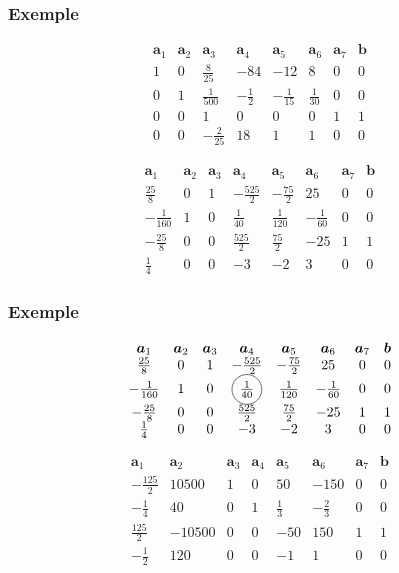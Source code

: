 \documentclass[usepdftitle=false]{beamer}
\newcommand*\circled[1]{\tikz[baseline=(char.base)]{
		\node[shape=circle,draw,inner sep=2pt] (char) {#1};}}
\def\ba{\boldsymbol{a}}
\def\bb{\boldsymbol{b}}
\begin{document}
\begin{frame}
\frametitle{Exemple}

\[
\begin{matrix}
\ba_1 & \ba_2 & \ba_3 & \ba_4 & \ba_5 &\ba_6 &\ba_7 & \bb \\
1 & 0 & \frac{8}{25} & -84 & -12 & 8 & 0 & 0 \\
0 & 1 & \frac{1}{500} & -\frac{1}{2} & -\frac{1}{15} & \frac{1}{30} & 0 & 0 \\
0 & 0 & 1 & 0 & 0 & 0 & 1 & 1 \\
0 & 0 & -\frac{2}{25} & 18 & 1 & 1 & 0 & 0
\end{matrix}
\]

\[
\begin{matrix}
\ba_1 & \ba_2 & \ba_3 & \ba_4 & \ba_5 &\ba_6 &\ba_7 & \bb \\
\frac{25}{8} & 0 & 1 & -\frac{525}{2} & -\frac{75}{2} & 25 & 0 & 0 \\
-\frac{1}{160} & 1 & 0 & \frac{1}{40} & \frac{1}{120} & -\frac{1}{60} & 0 & 0 \\
-\frac{25}{8} & 0 & 0 & \frac{525}{2} & \frac{75}{2} & -25 & 1 & 1 \\
\frac{1}{4} & 0 & 0 & -3 & -2 & 3 & 0 & 0
\end{matrix}
\]

\end{frame}

\begin{frame}
\frametitle{Exemple}

\[
\begin{matrix}
\ba_1 & \ba_2 & \ba_3 & \ba_4 & \ba_5 &\ba_6 &\ba_7 & \bb \\
\frac{25}{8} & 0 & 1 & -\frac{525}{2} & -\frac{75}{2} & 25 & 0 & 0 \\
-\frac{1}{160} & 1 & 0 & \circled{$\frac{1}{40}$} & \frac{1}{120} & -\frac{1}{60} & 0 & 0 \\
-\frac{25}{8} & 0 & 0 & \frac{525}{2} & \frac{75}{2} & -25 & 1 & 1 \\
\frac{1}{4} & 0 & 0 & -3 & -2 & 3 & 0 & 0
\end{matrix}
\]

\[
\begin{matrix}
\ba_1 & \ba_2 & \ba_3 & \ba_4 & \ba_5 &\ba_6 &\ba_7 & \bb \\
-\frac{125}{2} & 10500 & 1 & 0 & 50 & -150 & 0 & 0 \\
-\frac{1}{4} & 40 & 0 & 1 & \frac{1}{3} & -\frac{2}{3} & 0 & 0 \\
\frac{125}{2} & -10500 & 0 & 0 & -50 & 150 & 1 & 1 \\
-\frac{1}{2} & 120 & 0 & 0 & -1 & 1 & 0 & 0
\end{matrix}
\]

\end{frame}
\end{document}
